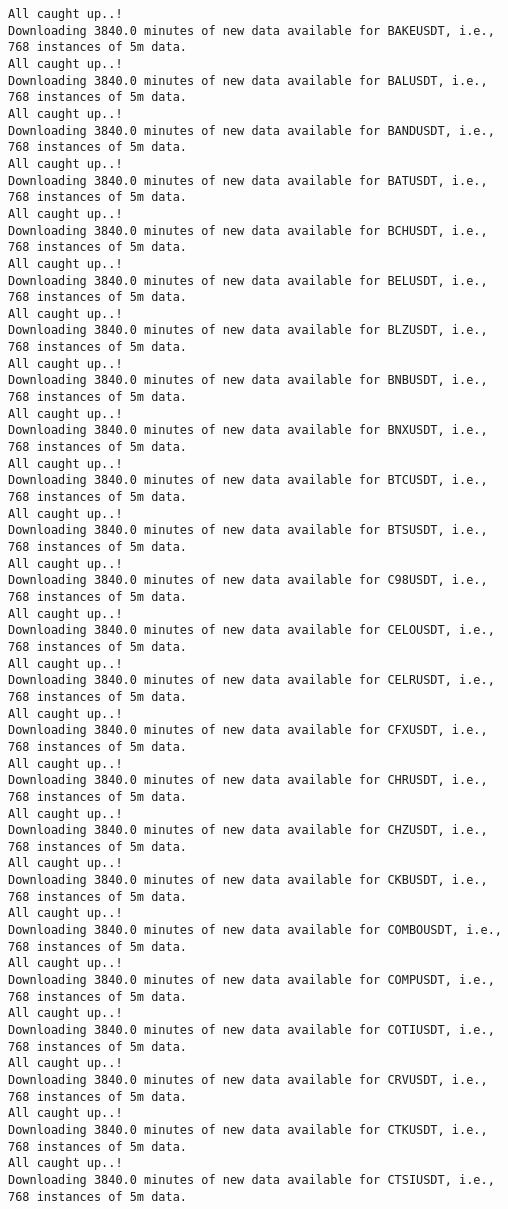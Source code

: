 \documentclass[
  letterpaper,
  DIV=11,
  numbers=noendperiod]{scrartcl}
\begin{document}
\begin{verbatim}
All caught up..!
Downloading 3840.0 minutes of new data available for BAKEUSDT, i.e., 768 instances of 5m data.
All caught up..!
Downloading 3840.0 minutes of new data available for BALUSDT, i.e., 768 instances of 5m data.
All caught up..!
Downloading 3840.0 minutes of new data available for BANDUSDT, i.e., 768 instances of 5m data.
All caught up..!
Downloading 3840.0 minutes of new data available for BATUSDT, i.e., 768 instances of 5m data.
All caught up..!
Downloading 3840.0 minutes of new data available for BCHUSDT, i.e., 768 instances of 5m data.
All caught up..!
Downloading 3840.0 minutes of new data available for BELUSDT, i.e., 768 instances of 5m data.
All caught up..!
Downloading 3840.0 minutes of new data available for BLZUSDT, i.e., 768 instances of 5m data.
All caught up..!
Downloading 3840.0 minutes of new data available for BNBUSDT, i.e., 768 instances of 5m data.
All caught up..!
Downloading 3840.0 minutes of new data available for BNXUSDT, i.e., 768 instances of 5m data.
All caught up..!
Downloading 3840.0 minutes of new data available for BTCUSDT, i.e., 768 instances of 5m data.
All caught up..!
Downloading 3840.0 minutes of new data available for BTSUSDT, i.e., 768 instances of 5m data.
All caught up..!
Downloading 3840.0 minutes of new data available for C98USDT, i.e., 768 instances of 5m data.
All caught up..!
Downloading 3840.0 minutes of new data available for CELOUSDT, i.e., 768 instances of 5m data.
All caught up..!
Downloading 3840.0 minutes of new data available for CELRUSDT, i.e., 768 instances of 5m data.
All caught up..!
Downloading 3840.0 minutes of new data available for CFXUSDT, i.e., 768 instances of 5m data.
All caught up..!
Downloading 3840.0 minutes of new data available for CHRUSDT, i.e., 768 instances of 5m data.
All caught up..!
Downloading 3840.0 minutes of new data available for CHZUSDT, i.e., 768 instances of 5m data.
All caught up..!
Downloading 3840.0 minutes of new data available for CKBUSDT, i.e., 768 instances of 5m data.
All caught up..!
Downloading 3840.0 minutes of new data available for COMBOUSDT, i.e., 768 instances of 5m data.
All caught up..!
Downloading 3840.0 minutes of new data available for COMPUSDT, i.e., 768 instances of 5m data.
All caught up..!
Downloading 3840.0 minutes of new data available for COTIUSDT, i.e., 768 instances of 5m data.
All caught up..!
Downloading 3840.0 minutes of new data available for CRVUSDT, i.e., 768 instances of 5m data.
All caught up..!
Downloading 3840.0 minutes of new data available for CTKUSDT, i.e., 768 instances of 5m data.
All caught up..!
Downloading 3840.0 minutes of new data available for CTSIUSDT, i.e., 768 instances of 5m data.

\end{verbatim}
\end{document}
